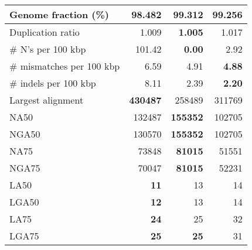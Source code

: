 \documentclass[12pt,a4paper]{article}
\begin{document}
\begin{table}[ht]
\begin{center}
\begin{tabular}{|l*{3}{|r}|}
Genome fraction (\%) & 98.482 & {\bf 99.312} & 99.256 \\ \hline
Duplication ratio & 1.009 & {\bf 1.005} & 1.017 \\ \hline
\# N's per 100 kbp & 101.42 & {\bf 0.00} & 2.92 \\ \hline
\# mismatches per 100 kbp & 6.59 & 4.91 & {\bf 4.88} \\ \hline
\# indels per 100 kbp & 8.11 & 2.39 & {\bf 2.20} \\ \hline
Largest alignment & {\bf 430487} & 258489 & 311769 \\ \hline
NA50 & 132487 & {\bf 155352} & 102705 \\ \hline
NGA50 & 130570 & {\bf 155352} & 102705 \\ \hline
NA75 & 73848 & {\bf 81015} & 51551 \\ \hline
NGA75 & 70047 & {\bf 81015} & 52231 \\ \hline
LA50 & {\bf 11} & 13 & 14 \\ \hline
LGA50 & {\bf 12} & 13 & 14 \\ \hline
LA75 & {\bf 24} & 25 & 32 \\ \hline
LGA75 & {\bf 25} & {\bf 25} & 31 \\ \hline
\end{tabular}
\end{center}
\end{table}
\end{document}
